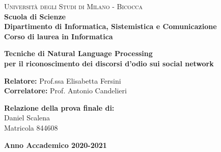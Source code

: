 \begin{titlepage}
    
    \noindent
    \begin{minipage}[t]{0.19\textwidth}
    \end{minipage}
    \begin{minipage}[t]{0.81\textwidth}
    {
            {\textsc{Università degli Studi di Milano - Bicocca}} \\
            \textbf{Scuola di Scienze} \\
            \textbf{Dipartimento di Informatica, Sistemistica e Comunicazione} \\
            \textbf{Corso di laurea in Informatica} \\
            \par
    }
    \end{minipage}
    
\vspace{40mm}
    
\begin{center}
        {\LARGE{
                \textbf{Tecniche di Natural Language Processing \\ per il riconoscimento dei discorsi d'odio sui social network}
                \par
        }}
    \end{center}
    
    \vspace{25mm}
    
    \noindent
    {\large \textbf{Relatore:} Prof.ssa Elisabetta Fersini} \\

    \noindent
    {\large \textbf{Correlatore:} Prof. Antonio Candelieri}
    
    \vspace{15mm}

    \begin{flushright}
        {\large \textbf{Relazione della prova finale di:}} \\
        \large{Daniel Scalena} \\
        \large{Matricola 844608} 
    \end{flushright}
    
    \vspace{20mm}
    
    \begin{center}
        {\large{\bf Anno Accademico 2020-2021}}
    \end{center}

    \restoregeometry
    
\end{titlepage}


